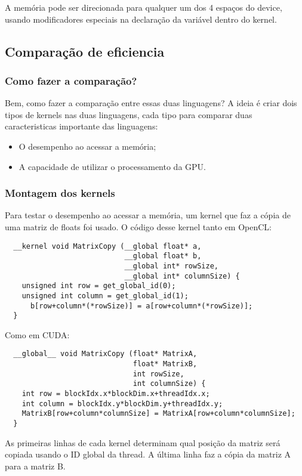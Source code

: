 A memória pode ser direcionada para qualquer um dos 4 espaços do device, usando modificadores especiais na declaração da variável
dentro do kernel.
\subsection{Comparação de eficiencia}
\subsubsection{Como fazer a comparação?}
Bem, como fazer a comparação entre essas duas linguagens? A ideia é criar dois tipos de kernels nas duas linguagens, cada tipo
para comparar duas caracteristicas importante das linguagens:
\begin{itemize}
  \item O desempenho ao acessar a memória;
  \item A capacidade de utilizar o processamento da GPU.
\end{itemize}
\subsubsection{Montagem dos kernels}
Para testar o desempenho ao acessar a memória, um kernel que faz a cópia de uma matriz de floats foi usado. O código desse kernel
tanto em OpenCL:

\begin{lstlisting}
  __kernel void MatrixCopy (__global float* a, 
                            __global float* b, 
                            __global int* rowSize, 
                            __global int* columnSize) {
    unsigned int row = get_global_id(0);
    unsigned int column = get_global_id(1);
	  b[row+column*(*rowSize)] = a[row+column*(*rowSize)];
  }
\end{lstlisting}

Como em CUDA:

\begin{lstlisting}
  __global__ void MatrixCopy (float* MatrixA, 
                              float* MatrixB, 
                              int rowSize, 
                              int columnSize) {
    int row = blockIdx.x*blockDim.x+threadIdx.x;
    int column = blockIdx.y*blockDim.y+threadIdx.y;
    MatrixB[row+column*columnSize] = MatrixA[row+column*columnSize];
  }
\end{lstlisting}

As primeiras linhas de cada kernel determinam qual posição da matriz será copiada usando o ID global da thread.
A última linha faz a cópia da matriz A para a matriz B. \\

